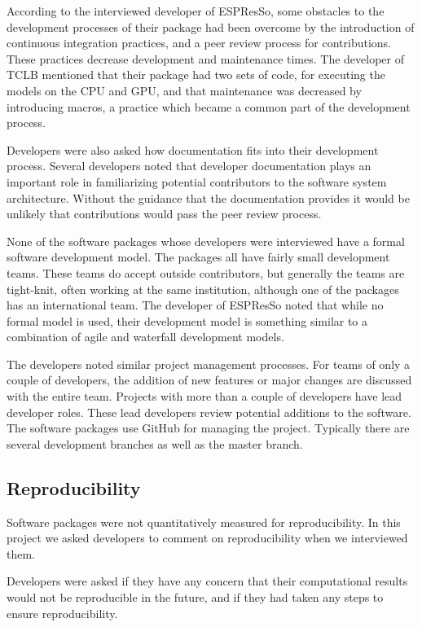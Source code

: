 \documentclass[final, 3p, times, authoryear]{elsarticle}
\begin{document}
According to the interviewed developer of ESPResSo, some obstacles to the
development processes of their package had been overcome by the introduction of
continuous integration practices, and a peer review process for contributions.
These practices decrease development and maintenance times. The developer of
TCLB mentioned that their package had two sets of code, for executing the models
on the CPU and GPU, and that maintenance was decreased by introducing macros, a
practice which became a common part of the development process. 

Developers were also asked how documentation fits into their development
process. Several developers noted that developer documentation plays an
important role in familiarizing potential contributors to the software system
architecture. Without the guidance that the documentation provides it would be
unlikely that contributions would pass the peer review process. 

None of the software packages whose developers were interviewed have a formal
software development model. The packages all have fairly small development
teams. These teams do accept outside contributors, but generally the teams are
tight-knit, often working at the same institution, although one of the packages
has an international team. The developer of ESPResSo noted that while no formal
model is used, their development model is something similar to a combination of
agile and waterfall development models. 

The developers noted similar project management processes. For teams of only a
couple of developers, the addition of new features or major changes are
discussed with the entire team. Projects with more than a couple of developers
have lead developer roles. These lead developers review potential additions to
the software. The software packages use GitHub for managing the project.
Typically there are several development branches as well as the master branch.

\subsection{Reproducibility}

Software packages were not quantitatively measured for reproducibility. In this
project we asked developers to comment on reproducibility when we interviewed
them.

Developers were asked if they have any concern that their computational results
would not be reproducible in the future, and if they had taken any steps to
ensure reproducibility.
\end{document}
